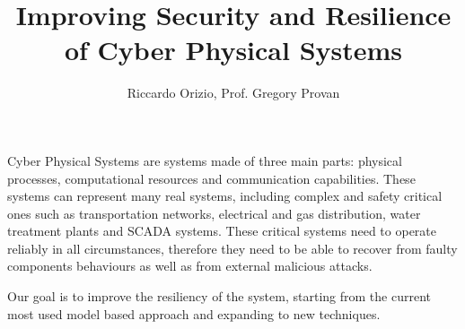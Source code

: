 \documentclass{tikzposter}
\title{Improving Security and Resilience of Cyber Physical Systems}
\author{Riccardo Orizio, Prof. Gregory Provan}
\institute{University College Cork}
\begin{document}
	\maketitle[width=0.9\textwidth]

	{
		Cyber Physical Systems are systems made of three main parts: physical
		processes, computational resources and communication capabilities.
		These systems can represent many real systems, including complex and
		safety critical ones such as transportation networks, electrical and gas
		distribution, water treatment plants and SCADA systems.
		These critical systems need to operate reliably in all circumstances,
		therefore they need to be able to recover from faulty components
		behaviours as well as from external malicious attacks.

		Our goal is to improve the resiliency of the system, starting from the
		current most used model based approach and expanding to new techniques.




	}
\end{document}
